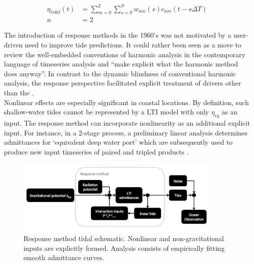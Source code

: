 \begin{align}
\label{E:lags}
\eta_{tidal}(t) &= \sum_{m=0}^{2}\sum_{s=0}^{S} w_{nm}(s)c_{nm}(t-s\Delta T)\\
              n &= 2   \nonumber
\end{align}

The introduction of response methods in the 1960's was not motivated by a user-driven need to improve tide predictions.  It could rather been seen as a move to review the well-embedded conventions of harmonic analysis in the contemporary language of timeseries analysis and ``make explicit what the harmonic method does anyway''\citep[pp 540]{Munk:1966ts}.  In contrast to the dynamic blindness of conventional harmonic analysis, the response perspective facilitated explicit treatment of drivers other than the \ATGP{}.\\

Nonlinear effects are especially significant in coastal locations.   By definition, such shallow-water tides cannot be represented by a LTI model with only $\eta_{eq}$ as an input.  The response method can incorporate nonlinearity as an additional explicit input.    For instance,  in a 2-stage process, a preliminary linear analysis determines admittances for `equivalent deep water port' which are subsequently used to produce new input timeseries of paired and tripled products \citep[pp 122]{Pugh:1996uz}.\\

\begin{figure}[h]
\begin{center}
\includegraphics[width=100mm]{figures/diagrams/response_analysis_flowchart.png}
\caption{Response method tidal schematic.  Nonlinear and non-gravitational inputs are explicitly formed.   Analysis consists of empirically fitting smooth admittance curves.}
\label{fig:response}
\end{center}
\end{figure}

